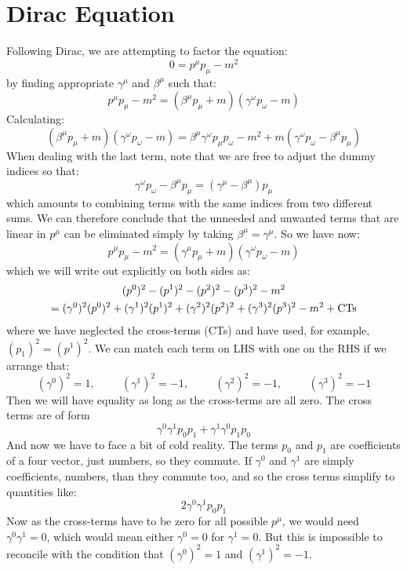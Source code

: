 \documentclass[12pt]{article}
\begin{document}
\section{Dirac Equation}
Following Dirac, we are attempting to factor the equation:
$$0 = p^\mu p_\mu - m^2 $$
by finding appropriate $\gamma^\mu$ and $\beta^\mu$ such that:
$$p^\mu p_\mu - m^2  = (\beta^\mu p_\mu + m) (\gamma^\omega p_\omega - m)$$
Calculating:
$$(\beta^\mu p_\mu + m) (\gamma^\omega p_\omega - m)
= \beta^\mu \gamma^\omega p_\mu p_\omega - m^2 + m (\gamma^\omega p_\omega - \beta^\mu p_\mu)$$
When dealing with the last term, note that we are free to adjust the dummy indices so that:
$$\gamma^\omega p_\omega - \beta^\mu p_\mu = (\gamma^\mu - \beta^\mu) p_\mu$$
which amounts to combining terms with the same indices from two different sums.  We can therefore conclude that the unneeded and unwanted terms that are linear in $p^\mu$ can be eliminated simply by taking $\beta^\mu = \gamma^\mu$.  So we have now:
$$p^\mu p_\mu - m^2  = (\gamma^\mu p_\mu + m) (\gamma^\omega p_\omega - m)$$
which we will write out explicitly on both sides as:
\begin{multline*}
(p^0)^2-(p^1)^2-(p^2)^2-(p^3)^2-m^2 \\
= (\gamma^0)^2 (p^0)^2 + (\gamma^1)^2 (p^1)^2 + (\gamma^2)^2 (p^2)^2 + (\gamma^3)^2 (p^3)^2
-m^2 + {\rm CTs}
\end{multline*}
where we have neglected the cross-terms (CTs) and have used, for example, $(p_1)^2=(p^1)^2$.  We can match each term on LHS with one on the RHS if we arrange that:
\begin{equation}
\label{eqn:gammasq}
(\gamma^0)^2=1, \hspace{1cm} (\gamma^1)^2=-1,  \hspace{1cm} (\gamma^2)^2=-1,
 \hspace{1cm} (\gamma^3)^2=-1
\end{equation}
Then we will have equality as long as the cross-terms are all zero.  The cross terms are of form
$$\gamma^0 \gamma^1 p_0 p_1 + \gamma^1 \gamma^0 p_1 p_0$$
And now we have to face a bit of cold reality.  The terms $p_0$ and $p_1$ are coefficients of a four vector, just numbers, so they commute.  If $\gamma^0$ and $\gamma^1$ are simply coefficients, numbers, than they commute too, and so the cross terms simplify to quantities like:
$$2 \gamma^0 \gamma^1 p_0 p_1$$
Now as the cross-terms have to be zero for all possible $p^\mu$, we would need $\gamma^0 \gamma^1 = 0$, which would mean either $\gamma^0 = 0$ for $\gamma^1=0$.  But this is impossible to reconcile with the condition that $(\gamma^0)^2 = 1$ and $(\gamma^1)^2 = -1$.
\end{document}
